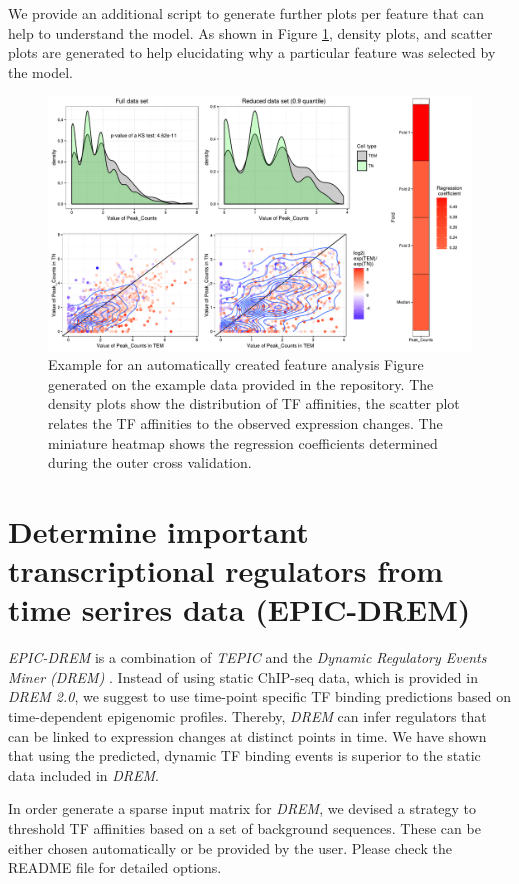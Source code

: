 \documentclass{article}
\begin{document}
We provide an additional script to generate further plots per feature that can help to understand the model. As shown in Figure \ref{ExampleAnalysisOfDynamite},
density plots, and scatter plots are generated to help elucidating why a particular feature was selected by the model.
\begin{figure}[h!]
\centering
\includegraphics[width=\textwidth]{Feature_overview_TEMvsTN_Peak_Counts.pdf}
\caption{Example for an automatically created feature analysis Figure generated on the example data provided in the repository. The density plots show the distribution of TF affinities, the
scatter plot relates the TF affinities to the observed expression changes. The miniature heatmap shows the regression coefficients determined during the outer cross validation.}
\label{ExampleAnalysisOfDynamite}
\end{figure}

\newpage
\section{Determine important transcriptional regulators from time serires data (EPIC-DREM)}
\label{EPIC-DREM}
\textit{EPIC-DREM} is a combination of \textit{TEPIC}  and the \textit{Dynamic Regulatory Events Miner (DREM)} \cite{pmid17224918}.
Instead of using static ChIP-seq data, which is provided in \textit{DREM 2.0}, we suggest to use time-point specific TF binding predictions
based on time-dependent epigenomic profiles. Thereby, \textit{DREM} can infer regulators that can be linked to expression changes at distinct points in time.
We have shown that using the predicted, dynamic TF binding events is superior to the static data included in \textit{DREM}.

In order generate a sparse input matrix for \textit{DREM}, we devised a strategy to threshold TF affinities based on a set of background sequences.
These can be either chosen automatically or be provided by the user. Please check the README file for detailed options. 
\end{document}
